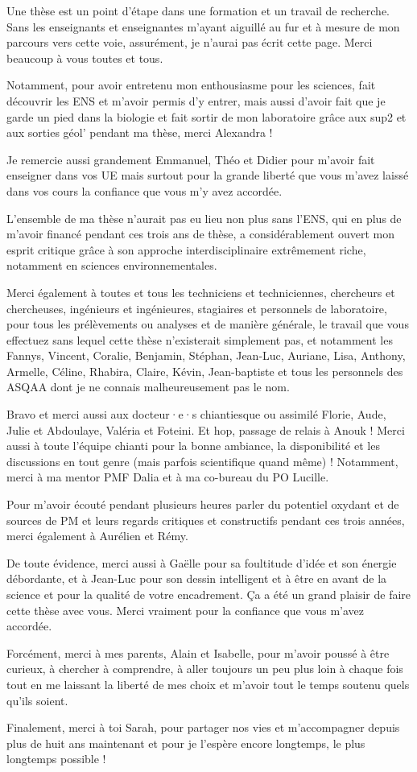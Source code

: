 
Une thèse est un point d'étape dans une formation et un travail de recherche.
Sans les enseignants et enseignantes m'ayant aiguillé au fur et à mesure de mon parcours
vers cette voie, assurément, je n'aurai pas écrit cette page. Merci beaucoup à vous
toutes et tous.

Notamment, pour avoir entretenu mon enthousiasme pour les sciences, fait découvrir les ENS
et m'avoir permis d'y entrer, mais aussi d'avoir fait que je garde un pied dans la
biologie et fait sortir de mon laboratoire grâce aux sup2 et aux sorties géol' pendant
ma thèse, merci Alexandra !

Je remercie aussi grandement Emmanuel, Théo et Didier pour m'avoir fait enseigner
dans vos UE mais surtout pour la grande liberté que vous m'avez laissé dans vos cours la
confiance que vous m'y avez accordée.

L'ensemble de ma thèse n'aurait pas eu lieu non plus sans l'ENS, qui en plus de m'avoir
financé pendant ces trois ans de thèse, a considérablement ouvert mon esprit critique
grâce à son approche interdisciplinaire extrêmement riche, notamment en sciences
environnementales.

Merci également à toutes et tous les techniciens et techniciennes, chercheurs et
chercheuses, ingénieurs et ingénieures, stagiaires et personnels de laboratoire, pour
tous les prélèvements ou analyses et de
manière générale, le travail que vous effectuez sans lequel cette thèse n'existerait
simplement pas, et notamment les Fannys, Vincent, Coralie, Benjamin, Stéphan, Jean-Luc,
Auriane, Lisa, Anthony, Armelle, Céline, Rhabira, Claire, Kévin, Jean-baptiste et tous
les personnels des ASQAA dont je ne connais malheureusement pas le nom.

Bravo et merci aussi aux docteur·e·s chiantiesque ou assimilé Florie, Aude, Julie et
Abdoulaye, Valéria et Foteini. Et hop, passage de relais à Anouk !
Merci aussi à toute l'équipe chianti pour la bonne ambiance, la disponibilité et
les discussions en tout genre (mais parfois scientifique quand même) !
Notamment, merci à ma mentor PMF Dalia et à ma co-bureau du PO Lucille.

Pour m'avoir écouté pendant plusieurs heures parler du potentiel oxydant et de sources
de PM et leurs regards critiques et constructifs pendant ces trois années, merci
également à Aurélien et Rémy.

De toute évidence, merci aussi à Gaëlle pour sa foultitude d'idée et son énergie
débordante, et à Jean-Luc pour son dessin intelligent et à être en avant de la science et
pour la qualité de votre encadrement.
Ça a été un grand plaisir de faire cette thèse avec vous. Merci vraiment pour la
confiance que vous m'avez accordée.

Forcément, merci à mes parents, Alain et Isabelle, pour m'avoir poussé à être curieux, à
chercher à comprendre, à aller toujours un peu plus loin à chaque fois tout en me
laissant la liberté de mes choix et m'avoir tout le temps soutenu quels qu'ils soient.

Finalement, merci à toi Sarah, pour partager nos vies et m'accompagner depuis plus de
huit ans maintenant et pour je l'espère encore longtemps, le plus longtemps possible !



